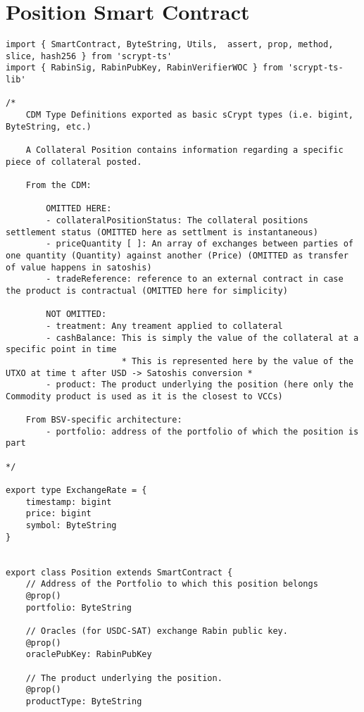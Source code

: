 \section{Position Smart Contract}
\label{app:position}

\begin{lstlisting}[style=htmlcssjs, caption=Position Smart Contract]
import { SmartContract, ByteString, Utils,  assert, prop, method, slice, hash256 } from 'scrypt-ts'
import { RabinSig, RabinPubKey, RabinVerifierWOC } from 'scrypt-ts-lib'

/*
    CDM Type Definitions exported as basic sCrypt types (i.e. bigint, ByteString, etc.)

    A Collateral Position contains information regarding a specific piece of collateral posted.
    
    From the CDM:

        OMITTED HERE:
        - collateralPositionStatus: The collateral positions settlement status (OMITTED here as settlment is instantaneous)
        - priceQuantity [ ]: An array of exchanges between parties of one quantity (Quantity) against another (Price) (OMITTED as transfer of value happens in satoshis)
        - tradeReference: reference to an external contract in case the product is contractual (OMITTED here for simplicity)

        NOT OMITTED: 
        - treatment: Any treament applied to collateral
        - cashBalance: This is simply the value of the collateral at a specific point in time
                       * This is represented here by the value of the UTXO at time t after USD -> Satoshis conversion * 
        - product: The product underlying the position (here only the Commodity product is used as it is the closest to VCCs)

    From BSV-specific architecture:
        - portfolio: address of the portfolio of which the position is part

*/

export type ExchangeRate = {
    timestamp: bigint
    price: bigint
    symbol: ByteString
}


export class Position extends SmartContract {
    // Address of the Portfolio to which this position belongs
    @prop()
    portfolio: ByteString

    // Oracles (for USDC-SAT) exchange Rabin public key.
    @prop()
    oraclePubKey: RabinPubKey

    // The product underlying the position.
    @prop()
    productType: ByteString


\end{lstlisting}
